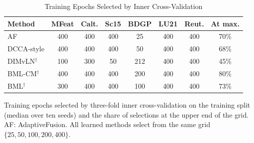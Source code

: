 \begin{table}[!t]
\caption{Training Epochs Selected by Inner Cross-Validation}
\label{tab:epochs}
\centering
\footnotesize
\setlength{\tabcolsep}{2.5pt}
\begin{tabular}{lccccccc}
\toprule
Method & MFeat & Calt. & Sc15 & BDGP & LU21 & Reut. & At max. \\
\midrule
AF & 400 & 400 & 400 & 25 & 400 & 400 & 70\% \\
DCCA-style & 400 & 400 & 400 & 50 & 400 & 400 & 68\% \\
DIMvLN$^\dagger$ & 100 & 300 & 50 & 212 & 400 & 400 & 45\% \\
BML-CM$^\dagger$ & 400 & 400 & 400 & 200 & 400 & 400 & 80\% \\
BML$^\dagger$ & 300 & 400 & 400 & 100 & 400 & 400 & 73\% \\
\bottomrule
\end{tabular}
\par\smallskip
\parbox{\linewidth}{\scriptsize Training epochs selected by three-fold inner cross-validation on the training split (median over ten seeds) and the share of selections at the upper end of the grid. AF: AdaptiveFusion. All learned methods select from the same grid $\{25,50,100,200,400\}$.}
\end{table}
